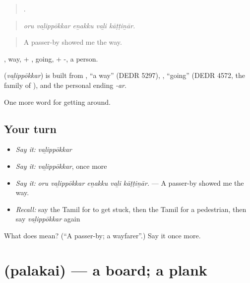 \begin{quote}
    .
\end{quote}

\begin{quote}
\emph{oru vaḻippōkkar eṉakku vaḻi kāṭṭiṉār.}
\end{quote}

\begin{quote}
A passer-by showed me the way.
\end{quote}

, way, + , going, + -, a person.

\begin{cousinweb}
\textbf{} (\emph{vaḻippōkkar}) is built from , \textquotedblleft{}a way\textquotedblright{} (DEDR 5297), , \textquotedblleft{}going\textquotedblright{} (DEDR 4572, the family of ), and the personal ending \emph{-ar}.
\end{cousinweb}

\begin{grammarlens}[title={What you've built}]
One more word for getting around.
\end{grammarlens}

\subsection*{Your turn}
\begin{itemize}
\raggedright
  \item \emph{Say it:} \emph{vaḻippōkkar}
  \item \emph{Say it:} \emph{vaḻippōkkar}, once more
  \item \emph{Say it:} \emph{oru vaḻippōkkar eṉakku vaḻi kāṭṭiṉār.} — A passer-by showed me the way.
  \item \emph{Recall:} say the Tamil for to get stuck, then the Tamil for a pedestrian, then say \emph{vaḻippōkkar} again
\end{itemize}

\begin{tcolorbox}[breakable,colback=teal!4,colframe=teal!35!black,title={Before you move on}]
What does  mean? (\textquotedblleft{}A passer-by; a wayfarer\textquotedblright{}.) Say it once more.
\end{tcolorbox}
\section[\texorpdfstring{\ta{பலகை} (palakai)}{பலகை (palakai)}]{ (palakai) — a board; a plank}

